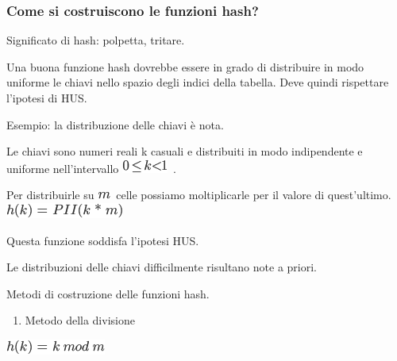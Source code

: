 \documentclass{article}
\providecommand{\tightlist}{%
  \setlength{\itemsep}{0pt}\setlength{\parskip}{0pt}}
\begin{document}
{}

\hypertarget{h.9kljpwmnt7yd}{\subsubsection{\texorpdfstring{{Come si
costruiscono le funzioni
hash?}}{Come si costruiscono le funzioni hash?}}\label{h.9kljpwmnt7yd}}

{Significato di hash: polpetta, tritare.}

{}

{Una buona funzione hash dovrebbe essere in grado di distribuire in modo
uniforme le chiavi nello spazio degli indici della tabella. Deve quindi
rispettare l'ipotesi di HUS.}

{}

{Esempio: la distribuzione delle chiavi è nota.}

{Le chiavi sono numeri reali k casuali e distribuiti in modo
indipendente e uniforme nell'intervallo
}\includegraphics{images/image253.png}{~.}

{Per distribuirle su }\includegraphics{images/image235.png}{~celle
possiamo moltiplicarle per il valore di quest'ultimo.
}\includegraphics{images/image254.png}

{Questa funzione soddisfa l'ipotesi HUS.}

{}

{Le distribuzioni delle chiavi difficilmente risultano note a priori. }

{}

{}

{}

{Metodi di costruzione delle funzioni hash.}

{}

\begin{enumerate}
\tightlist
\item
  {Metodo della divisione}
\end{enumerate}

{}

\includegraphics{images/image255.png}
\end{document}
